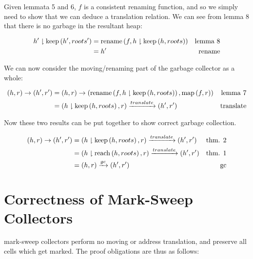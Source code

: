 \begin{theorem}
  Given lemmata 5 and 6, $f$ is a consistent renaming function, and so
  we simply need to show that we can deduce a translation relation. We
  can see from lemma 8 that there is no garbage in the resultant heap:

  \begin{align*}
    h' \restrict \keep{h'}{roots'} &= \rename{f}{h \restrict
      \keep{h}{roots}} &\mbox {lemma 8}\\
    &= h' & \mbox{rename}
  \end{align*}

  We can now consider the moving/renaming part of the garbage
  collector as a whole:

  \begin{align*}
    (h, r) \to (h', r') &= (h, r) \to \left(\rename{f}{h \restrict
        \keep{h}{roots}}, \map{f}{r}\right) & \mbox{lemma 7}\\
    &= (h \restrict \keep{h}{roots}, r) \translate (h', r') &\mbox{translate}
  \end{align*}
\end{theorem}

Now these two results can be put together to show correct garbage
collection.

\begin{theorem}
  \begin{align*}
    (h, r) \to (h', r') &= (h \restrict \keep{h}{roots}, r) \translate
    (h', r') & \mbox{thm. 2}\\
    &= (h \restrict \reach{h}{roots}, r) \translate (h', r') &
    \mbox{thm. 1}\\
    &= (h, r) \gc (h', r') &\mbox{gc}
  \end{align*}
\end{theorem}

\section{Correctness of Mark-Sweep Collectors}

\Gls{mark-sweep} \glspl{collector} perform no moving or address
translation, and preserve all \glspl{cell} which get marked. The proof
obligations are thus as follows:

\begin{prooftree}
\end{prooftree}

